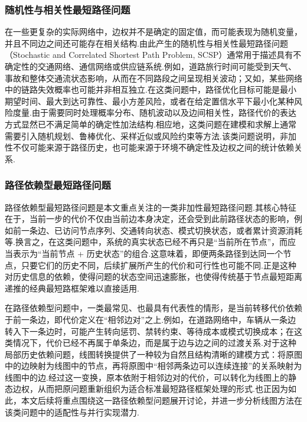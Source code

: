 \subsubsection{随机性与相关性最短路径问题}

在一些更复杂的实际网络中，边权并不是确定的固定值，而可能表现为随机变量，并且不同边之间还可能存在相关结构.由此产生的随机性与相关性最短路径问题（Stochastic and Correlated Shortest Path Problem, SCSP）通常用于描述具有不确定性的交通网络、通信网络或供应链系统.例如，道路旅行时间可能受到天气、事故和整体交通流状态影响，从而在不同路段之间呈现相关波动；又如，某些网络中的链路失效概率也可能并非相互独立.在这类问题中，路径优化目标可能是最小期望时间、最大到达可靠性、最小方差风险，或者在给定置信水平下最小化某种风险度量.由于需要同时处理概率分布、随机波动以及边间相关性，路径代价的表达方式显然已不满足简单的确定性加法结构.相应地，这类问题在建模和求解上通常需要引入随机规划、鲁棒优化、采样近似或风险约束等方法.该类问题说明，非加性不仅可能来源于路径历史，也可能来源于环境不确定性及边权之间的统计依赖关系\cite{frank1969probabilistic,nikolova2006approx,birge2011stochastic,bertsimas2011robust}.

\subsubsection{路径依赖型最短路径问题}

路径依赖型最短路径问题是本文重点关注的一类非加性最短路径问题.其核心特征在于，当前一步的代价不仅由当前边本身决定，还会受到此前路径状态的影响，例如前一条边、已访问节点序列、交通转向状态、模式切换状态，或者累计资源消耗等.换言之，在这类问题中，系统的真实状态已经不再只是“当前所在节点”，而应当表示为“当前节点 + 历史状态”的组合.这意味着，即便两条路径到达同一个节点，只要它们的历史不同，后续扩展所产生的代价和可行性也可能不同.正是这种对历史信息的依赖，使得问题的状态空间迅速膨胀，也使得传统基于节点最短距离递推的经典最短路框架难以直接适用.

在路径依赖型问题中，一类最常见、也最具有代表性的情形，是当前转移代价依赖于前一条边，即代价定义在“相邻边对”之上.例如，在道路网络中，车辆从一条边转入下一条边时，可能产生转向惩罚、禁转约束、等待成本或模式切换成本；在这类情况下，代价已经不再属于单条边，而是属于边与边之间的过渡关系.对于这种局部历史依赖问题，线图转换提供了一种较为自然且结构清晰的建模方式：将原图中的边映射为线图中的节点，再将原图中“相邻两条边可以连续连接”的关系映射为线图中的边.经过这一变换，原本依附于相邻边对的代价，可以转化为线图上的静态边权，从而把原问题重新组织为适合标准最短路径框架处理的形式.也正因为如此，本文后续将重点围绕这一路径依赖型问题展开讨论，并进一步分析线图方法在该类问题中的适配性与并行实现潜力\cite{gj1979np,thomas2007timepath,irnich2005spprc,desaulniers2014vrptw}.

